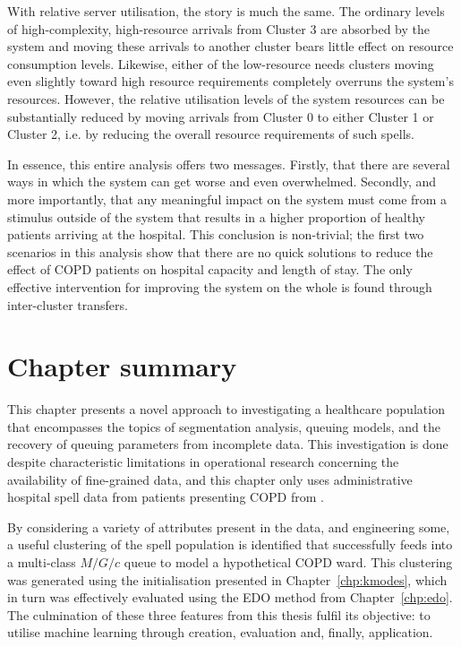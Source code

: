 With relative server utilisation, the story is much the same. The ordinary
levels of high-complexity, high-resource arrivals from Cluster 3 are absorbed by
the system and moving these arrivals to another cluster bears little effect on
resource consumption levels. Likewise, either of the low-resource needs clusters
moving even slightly toward high resource requirements completely overruns the
system’s resources. However, the relative utilisation levels of the system
resources can be substantially reduced by moving arrivals from Cluster 0 to
either Cluster 1 or Cluster 2, i.e. by reducing the overall resource
requirements of such spells.

In essence, this entire analysis offers two messages. Firstly, that there are
several ways in which the system can get worse and even overwhelmed. Secondly,
and more importantly, that any meaningful impact on the system must come from a
stimulus outside of the system that results in a higher proportion of healthy
patients arriving at the hospital. This conclusion is non-trivial; the first two
scenarios in this analysis show that there are no quick solutions to reduce the
effect of COPD patients on hospital capacity and length of stay. The only
effective intervention for improving the system on the whole is found through
inter-cluster transfers.


\section{Chapter summary}\label{sec:copd:summary}

This chapter presents a novel approach to investigating a healthcare population
that encompasses the topics of segmentation analysis, queuing models, and the
recovery of queuing parameters from incomplete data. This investigation is done
despite characteristic limitations in operational research concerning the
availability of fine-grained data, and this chapter only uses administrative
hospital spell data from patients presenting COPD from \ctmuhb.

By considering a variety of attributes present in the data, and engineering
some, a useful clustering of the spell population is identified that
successfully feeds into a multi-class \(M/G/c\) queue to model a hypothetical
COPD ward. This clustering was generated using the initialisation presented in
Chapter~\ref{chp:kmodes}, which in turn was effectively evaluated using the
EDO method from Chapter~\ref{chp:edo}. The culmination of these three features
from this thesis fulfil its objective: to utilise machine learning through
creation, evaluation and, finally, application.

